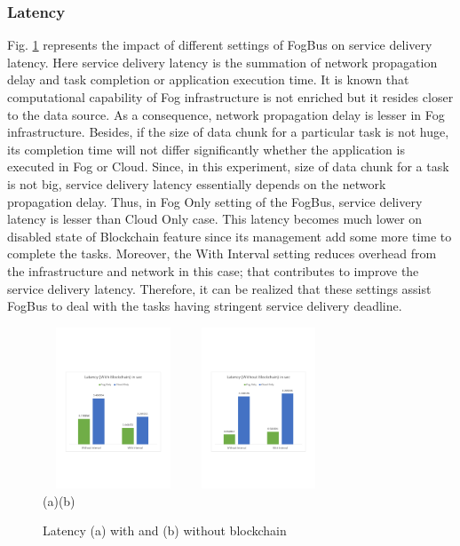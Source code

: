 \documentclass[final,5p,times,twocolumn]{elsarticle}
\begin{document}
\subsubsection{Latency}
Fig. \ref{fig:latency} represents the impact of different settings of FogBus on service delivery latency. Here service delivery latency is the summation of network propagation delay and task completion or application execution time. It is known that computational capability of Fog infrastructure is not enriched but it resides closer to the data source. As a consequence, network propagation delay is lesser in Fog infrastructure. Besides, if the size of data chunk for a particular task is not huge, its completion time will not differ significantly whether the application is executed in Fog or Cloud. Since, in this experiment, size of data chunk for a task is not big, service delivery latency essentially depends on the network propagation delay. Thus, in Fog Only setting of the FogBus, service delivery latency is lesser than Cloud Only case. This latency becomes much lower on disabled state of Blockchain feature since its management add some more time to complete the tasks. Moreover, the With Interval setting reduces overhead from the infrastructure and network in this case; that contributes to improve the service delivery latency. Therefore, it can be realized that these settings assist FogBus to deal with the tasks having stringent service delivery deadline.
%
\begin{figure}[h]
	\begin{center}
	\centering
		\includegraphics[width=42mm, height=48mm]{Latency1}
		\hspace{5pt}
		\includegraphics[width=42mm, height=48mm]{Latency2}\\
        \footnotesize{(a)\hspace{120pt}(b)}\\		 
   	\caption{Latency (a) with and (b) without blockchain} \label{fig:latency}
	\end{center}
\end{figure}
%
\end{document}
